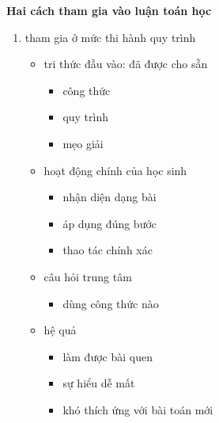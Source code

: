 {{  \noindent\textbf{Hai cách tham gia vào luận toán học}\vspace{.25\baselineskip}

  \begin{enumerate}
    \item tham gia ở mức thi hành quy trình
      \begin{itemize}
        \item tri thức đầu vào: đã được cho sẵn
          \begin{itemize}
            \item công thức
            \item quy trình
            \item mẹo giải
          \end{itemize}
        \item hoạt động chính của học sinh
          \begin{itemize}
            \item nhận diện dạng bài
            \item áp dụng đúng bước
            \item thao tác chính xác
          \end{itemize}
        \item câu hỏi trung tâm
          \begin{itemize}
            \item dùng công thức nào
          \end{itemize}
        \item hệ quả
          \begin{itemize}
            \item làm được bài quen
            \item sự hiểu dễ mất
            \item khó thích ứng với bài toán mới
          \end{itemize}
      \end{itemize}


\end{enumerate}}}
